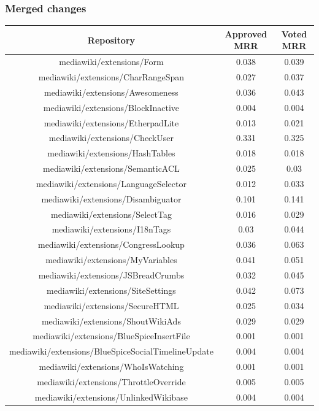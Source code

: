 \subsubsection{Merged changes}
\hspace{0.25cm}
\begin{center}
\begin{tabular}{@{}c c c@{}} 
 \hline
    \textbf{Repository} & {Approved MRR} & {Voted MRR} \\
\hline
mediawiki/extensions/Form & 0.038 & 0.039 \\
mediawiki/extensions/CharRangeSpan & 0.027 & 0.037 \\
mediawiki/extensions/Awesomeness & 0.036 & 0.043 \\
mediawiki/extensions/BlockInactive & 0.004 & 0.004 \\
mediawiki/extensions/EtherpadLite & 0.013 & 0.021 \\
mediawiki/extensions/CheckUser & 0.331 & 0.325 \\
mediawiki/extensions/HashTables & 0.018 & 0.018 \\
mediawiki/extensions/SemanticACL & 0.025 & 0.03 \\
mediawiki/extensions/LanguageSelector & 0.012 & 0.033 \\
mediawiki/extensions/Disambiguator & 0.101 & 0.141 \\
mediawiki/extensions/SelectTag & 0.016 & 0.029 \\
mediawiki/extensions/I18nTags & 0.03 & 0.044 \\
mediawiki/extensions/CongressLookup & 0.036 & 0.063 \\
mediawiki/extensions/MyVariables & 0.041 & 0.051 \\
mediawiki/extensions/JSBreadCrumbs & 0.032 & 0.045 \\
mediawiki/extensions/SiteSettings & 0.042 & 0.073 \\
mediawiki/extensions/SecureHTML & 0.025 & 0.034 \\
mediawiki/extensions/ShoutWikiAds & 0.029 & 0.029 \\
mediawiki/extensions/BlueSpiceInsertFile & 0.001 & 0.001 \\
mediawiki/extensions/BlueSpiceSocialTimelineUpdate & 0.004 & 0.004 \\
mediawiki/extensions/WhoIsWatching & 0.001 & 0.001 \\
mediawiki/extensions/ThrottleOverride & 0.005 & 0.005 \\
mediawiki/extensions/UnlinkedWikibase & 0.004 & 0.004 \\

\end{tabular}
\end{center}
